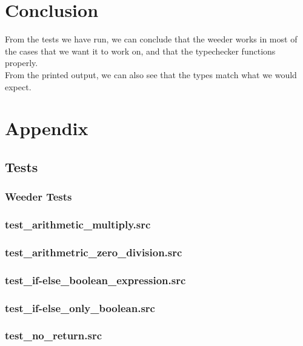 \documentclass[a4paper,10pt,titlepage]{report}
\begin{document}
\section{Conclusion}
From the tests we have run, we can conclude that the weeder works in most of the cases that we want it to work on, and that the typechecker functions properly.\\
From the printed output, we can also see that the types match what we would expect.

\newpage

\section{Appendix}
\subsection{Tests}
\subsubsection{Weeder Tests}
\subsubsection{test_arithmetic_multiply.src}


\subsubsection{test_arithmetric_zero_division.src}


\subsubsection{test_if-else_boolean_expression.src}


\subsubsection{test_if-else_only_boolean.src}


\subsubsection{test_no_return.src}

\end{document}
